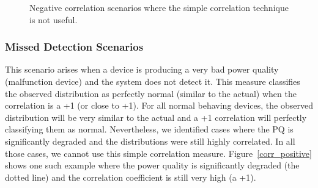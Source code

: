 \begin{figure}[!p]
\centering
{}

\vspace{1cm}

\vspace{1cm}
\caption{Negative correlation scenarios where the simple correlation technique is not useful.} 
\label{correlationAnalysisNegative}
\end{figure}

\subsubsection{Missed Detection Scenarios}
This scenario arises when a device is producing a very bad power quality (malfunction device) and the system does not detect it. This measure classifies the observed distribution as perfectly normal (similar to the actual) when the correlation is a +1 (or close to +1). For all normal behaving devices, the observed distribution will be very similar to the actual and a +1 correlation will perfectly classifying them as normal. Nevertheless, we identified cases where the PQ is significantly degraded and the distributions were still highly correlated. In all those cases, we cannot use this simple correlation measure. Figure~\ref{corr_positive} shows one such example where the power quality is significantly degraded (the dotted line) and the correlation coefficient is still very high (a +1).

